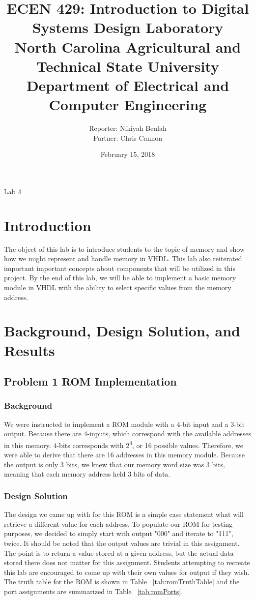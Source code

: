 \documentclass[11pt]{article}
\title {{\titleFont ECEN 429: Introduction to Digital Systems Design Laboratory \\ North Carolina Agricultural and Technical State University \\ Department of Electrical and Computer Engineering}} %
\author{\titleFont Reporter: Nikiyah Beulah \\ \titleFont Partner: Chris Cannon} %
\date{\titleFont February 15, 2018}
\begin{document}
\begin{titlingpage}
\maketitle
\begin{center}
	Lab 4
\end{center}
\end{titlingpage}

\section{Introduction}
The object of this lab is to introduce students to the topic of memory and show how we might represent and handle memory in VHDL. This lab also reiterated important important concepts about components that will be utilized in this project. By the end of this lab, we will be able to implement a basic memory module in VHDL with the ability to select specific values from the memory address.

\section{Background, Design Solution, and Results}

\subsection{Problem 1 ROM Implementation}

\subsubsection{Background}
We were instructed to implement a ROM module with a 4-bit input and a 3-bit output. Because there are 4-inputs, which correspond with the available addresses in this memory. 4-bits corresponds with 2\textsuperscript{4}, or 16 possible values. Therefore, we were able to derive that there are 16 addresses in this memory module. Because the output is only 3 bits, we knew that our memory word size was 3 bits, meaning that each memory address held 3 bits of data.

\subsubsection{Design Solution}

The design we came up with for this ROM is a simple case statement what will retrieve a different value for each address. To populate our ROM for testing purposes, we decided to simply start with output "000" and iterate to "111", twice. It should be noted that the output values are trivial in this assignment. The point is to return a value stored at a given address, but the actual data stored there does not matter for this assignment. Students attempting to recreate this lab are encouraged to come up with their own values for output if they wish. The truth table for the ROM is shown in Table ~\ref{tab:romTruthTable} and the port assignments are summarized in Table ~\ref{tab:romPorts}.
\end{document}
